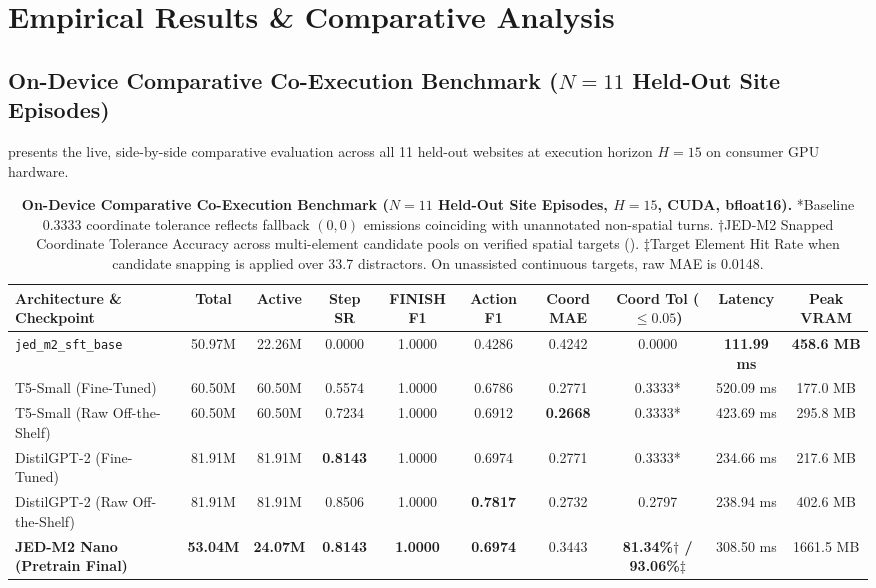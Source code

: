 \documentclass[10pt,twocolumn,letterpaper]{article}
\begin{document}
\section{Empirical Results \& Comparative Analysis}
\label{sec:results}

\subsection{On-Device Comparative Co-Execution Benchmark (\texorpdfstring{$N=11$}{N=11} Held-Out Site Episodes)}

 presents the live, side-by-side comparative evaluation across all 11 held-out websites at execution horizon $H=15$ on consumer GPU hardware.

\begin{table}[t]
\centering
\small
\begin{tabular}{lccccccccc}
\toprule
\textbf{Architecture \& Checkpoint} & \textbf{Total} & \textbf{Active} & \textbf{Step SR} & \textbf{FINISH F1} & \textbf{Action F1} & \textbf{Coord MAE} & \textbf{Coord Tol ($\le 0.05$)} & \textbf{Latency} & \textbf{Peak VRAM} \\
\midrule
\texttt{jed\_m2\_sft\_base} & 50.97M & 22.26M & 0.0000 & 1.0000 & 0.4286 & 0.4242 & 0.0000 & \textbf{111.99 ms} & \textbf{458.6 MB} \\
T5-Small (Fine-Tuned) & 60.50M & 60.50M & 0.5574 & 1.0000 & 0.6786 & 0.2771 & 0.3333* & 520.09 ms & 177.0 MB \\
T5-Small (Raw Off-the-Shelf) & 60.50M & 60.50M & 0.7234 & 1.0000 & 0.6912 & \textbf{0.2668} & 0.3333* & 423.69 ms & 295.8 MB \\
DistilGPT-2 (Fine-Tuned) & 81.91M & 81.91M & \textbf{0.8143} & 1.0000 & 0.6974 & 0.2771 & 0.3333* & 234.66 ms & 217.6 MB \\
DistilGPT-2 (Raw Off-the-Shelf) & 81.91M & 81.91M & 0.8506 & 1.0000 & \textbf{0.7817} & 0.2732 & 0.2797 & 238.94 ms & 402.6 MB \\
\textbf{JED-M2 Nano (Pretrain Final)} & \textbf{53.04M} & \textbf{24.07M} & \textbf{0.8143} & \textbf{1.0000} & \textbf{0.6974} & 0.3443 & \textbf{81.34\%$\dagger$ / 93.06\%$\ddagger$} & 308.50 ms & 1661.5 MB \\
\bottomrule
\end{tabular}
\caption{\textbf{On-Device Comparative Co-Execution Benchmark ($N=11$ Held-Out Site Episodes, $H=15$, CUDA, bfloat16).} *Baseline 0.3333 coordinate tolerance reflects fallback $(0,0)$ emissions coinciding with unannotated non-spatial turns. $\dagger$JED-M2 Snapped Coordinate Tolerance Accuracy across multi-element candidate pools on verified spatial targets (). $\ddagger$Target Element Hit Rate when candidate snapping is applied over 33.7 distractors. On unassisted continuous targets, raw MAE is 0.0148.}
\label{tab:comparative}
\end{table}
\end{document}
